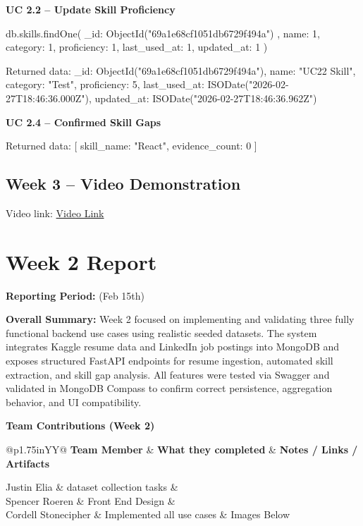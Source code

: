 \documentclass[11pt]{article}
\makeatletter
\newcommand{\WeekReport}[4]{
  \clearpage
  \section*{Week #1 Report}
  \addcontentsline{toc}{section}{Week #1 Report}
  \vspace{-0.25em}
  \noindent\textbf{Reporting Period:} #2

  \vspace{0.5em}
  \noindent\textbf{Overall Summary:} #3

  \vspace{0.75em}
  \noindent\textbf{Team Contributions (Week #1)}
  \vspace{0.25em}

  \begin{table}[H]
    \renewcommand{\arraystretch}{1.2}
    \begin{tabularx}{\linewidth}{@{}p{1.75in}YY@{}}
      \toprule
      \textbf{Team Member} & \textbf{What they completed} & \textbf{Notes / Links / Artifacts} \\
      \midrule
      #4
      \bottomrule
    \end{tabularx}
  \end{table}
}
\makeatother
\begin{document}
\noindent
\textbf{UC 2.2 -- Update Skill Proficiency}
\begin{TerminalBlock}
db.skills.findOne(
  { _id: ObjectId("69a1e68cf1051db6729f494a") },
  { name: 1, category: 1, proficiency: 1, last_used_at: 1, updated_at: 1 }
)
\end{TerminalBlock}
\begin{TerminalBlock}
Returned data:
{
  _id: ObjectId("69a1e68cf1051db6729f494a"),
  name: "UC22 Skill",
  category: "Test",
  proficiency: 5,
  last_used_at: ISODate("2026-02-27T18:46:36.000Z"),
  updated_at: ISODate("2026-02-27T18:46:36.962Z")
}
\end{TerminalBlock}

\noindent
\textbf{UC 2.4 -- Confirmed Skill Gaps}
\begin{TerminalBlock}
Returned data:
[
  { skill_name: "React", evidence_count: 0 }
]
\end{TerminalBlock}

\subsection*{Week 3 -- Video Demonstration}
\noindent
Video link: \href{https://www.loom.com/share/3b685219180343ff8ff40dd97bf698a3}{Video Link}


\WeekReport{2}{(Feb 15th)}{
Week 2 focused on implementing and validating three fully functional backend use cases using realistic seeded datasets. The system integrates Kaggle resume data and LinkedIn job postings into MongoDB and exposes structured FastAPI endpoints for resume ingestion, automated skill extraction, and skill gap analysis. All features were tested via Swagger and validated in MongoDB Compass to confirm correct persistence, aggregation behavior, and UI compatibility.

}{
Justin Elia & dataset collection tasks & \\
Spencer Roeren & Front End Design &  \\
Cordell Stonecipher & Implemented all use cases & Images Below\\
}
\end{document}
